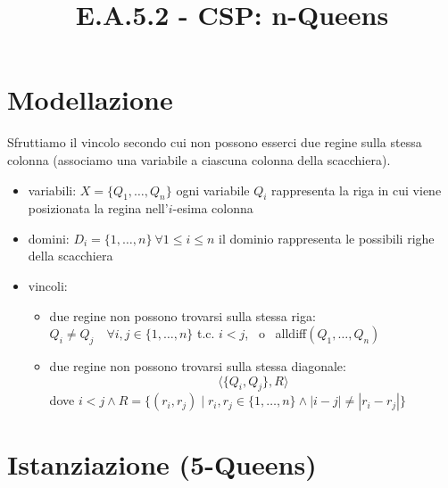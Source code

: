 \documentclass{article}
\title{E.A.5.2 - CSP: n-Queens}
\author{}
\date{}
\begin{document}
\maketitle
\section{Modellazione}
Sfruttiamo il vincolo secondo cui non possono esserci due regine sulla stessa colonna (associamo una variabile a ciascuna colonna della scacchiera).

\begin{itemize}
    \item variabili: $X = \{Q_1, \dots, Q_n\}$
        \subitem ogni variabile $Q_i$ rappresenta la riga in cui viene posizionata la regina nell'$i$-esima colonna
    \item domini: $D_i = \{1, \dots, n\} \ \forall 1 \leq i \leq n$
        \subitem il dominio rappresenta le possibili righe della scacchiera

    \item vincoli: 
\begin{itemize}
    \item due regine non possono trovarsi sulla stessa riga: 
        \subitem $Q_i \neq Q_j \quad \forall i, j \in \{1, \dots, n \}$ t.c. $i < j$, \ o \ alldiff$(Q_1, \dots, Q_n)$


 \item due regine non possono trovarsi sulla stessa diagonale:
     $$ \langle \{Q_i, Q_j\}, R \rangle $$
        dove
        $ i < j \land R = \{ (r_i, r_j) \mid r_i, r_j \in \{1, \dots, n\} \land |i - j| \neq |r_i - r_j| \} $

\end{itemize}
\end{itemize}   

\section{Istanziazione (5-Queens)}
\end{document}

